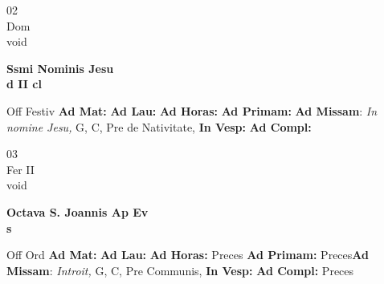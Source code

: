 \documentclass[10pt, openany]{book}
\begin{document}
    \begin{center}
        \begin{minipage}{3.5in}
            \vspace{2em}
            \begin{minipage}{0.5in}
                {\Huge 02} \\
                {\normalsize Dom} \\
                {\normalsize void}
            \end{minipage}
            \begin{minipage}{3.0in}
                \textbf{ \large Ssmi Nominis Jesu \\
                \textnormal{\normalsize d II cl}} \\ 
            \end{minipage}
            \begin{justify}Off Festiv
                \textbf{Ad Mat: }
                \textbf{Ad Lau: }
                \textbf{Ad Horas: }
                \textbf{Ad Primam: }\textbf{Ad Missam}: \textit{In nomine Jesu,} G, C, Pre de Nativitate,  
                \textbf{In Vesp: }
                \textbf{Ad Compl: }
            \end{justify}
        \end{minipage}
    \end{center}

    \begin{center}
        \begin{minipage}{3.5in}
            \vspace{2em}
            \begin{minipage}{0.5in}
                {\Huge 03} \\
                {\normalsize Fer II} \\
                {\normalsize void}
            \end{minipage}
            \begin{minipage}{3.0in}
                \textbf{ \large Octava S. Joannis Ap Ev \\
                \textnormal{\normalsize s}} \\ 
            \end{minipage}
            \begin{justify}Off Ord
                \textbf{Ad Mat: }
                \textbf{Ad Lau: }
                \textbf{Ad Horas: }Preces
                \textbf{Ad Primam: }Preces\textbf{Ad Missam}: \textit{Introit,} G, C, Pre Communis,  
                \textbf{In Vesp: }
                \textbf{Ad Compl: }Preces
            \end{justify}
        \end{minipage}
    \end{center}
\end{document}
